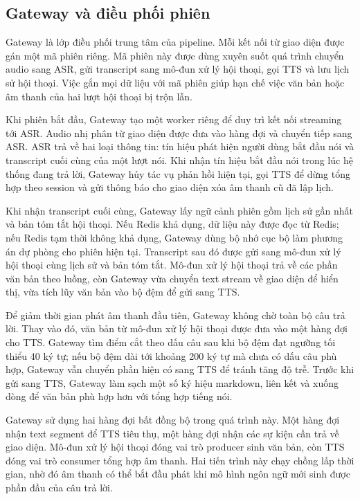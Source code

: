 \documentclass[a4paper,13pt,twoside]{report}
\begin{document}
\subsection{Gateway và điều phối phiên}

Gateway là lớp điều phối trung tâm của pipeline. Mỗi kết nối từ giao diện được gán một mã phiên riêng. Mã phiên này được dùng xuyên suốt quá trình chuyển audio sang ASR, gửi transcript sang mô-đun xử lý hội thoại, gọi TTS và lưu lịch sử hội thoại. Việc gắn mọi dữ liệu với mã phiên giúp hạn chế việc văn bản hoặc âm thanh của hai lượt hội thoại bị trộn lẫn.

Khi phiên bắt đầu, Gateway tạo một worker riêng để duy trì kết nối streaming tới ASR. Audio nhị phân từ giao diện được đưa vào hàng đợi và chuyển tiếp sang ASR. ASR trả về hai loại thông tin: tín hiệu phát hiện người dùng bắt đầu nói và transcript cuối cùng của một lượt nói. Khi nhận tín hiệu bắt đầu nói trong lúc hệ thống đang trả lời, Gateway hủy tác vụ phản hồi hiện tại, gọi TTS để dừng tổng hợp theo session và gửi thông báo cho giao diện xóa âm thanh cũ đã lập lịch.

Khi nhận transcript cuối cùng, Gateway lấy ngữ cảnh phiên gồm lịch sử gần nhất và bản tóm tắt hội thoại. Nếu Redis khả dụng, dữ liệu này được đọc từ Redis; nếu Redis tạm thời không khả dụng, Gateway dùng bộ nhớ cục bộ làm phương án dự phòng cho phiên hiện tại. Transcript sau đó được gửi sang mô-đun xử lý hội thoại cùng lịch sử và bản tóm tắt. Mô-đun xử lý hội thoại trả về các phần văn bản theo luồng, còn Gateway vừa chuyển text stream về giao diện để hiển thị, vừa tích lũy văn bản vào bộ đệm để gửi sang TTS.

Để giảm thời gian phát âm thanh đầu tiên, Gateway không chờ toàn bộ câu trả lời. Thay vào đó, văn bản từ mô-đun xử lý hội thoại được đưa vào một hàng đợi cho TTS. Gateway tìm điểm cắt theo dấu câu sau khi bộ đệm đạt ngưỡng tối thiểu 40 ký tự; nếu bộ đệm dài tới khoảng 200 ký tự mà chưa có dấu câu phù hợp, Gateway vẫn chuyển phần hiện có sang TTS để tránh tăng độ trễ. Trước khi gửi sang TTS, Gateway làm sạch một số ký hiệu markdown, liên kết và xuống dòng để văn bản phù hợp hơn với tổng hợp tiếng nói.

Gateway sử dụng hai hàng đợi bất đồng bộ trong quá trình này. Một hàng đợi nhận text segment để TTS tiêu thụ, một hàng đợi nhận các sự kiện cần trả về giao diện. Mô-đun xử lý hội thoại đóng vai trò producer sinh văn bản, còn TTS đóng vai trò consumer tổng hợp âm thanh. Hai tiến trình này chạy chồng lấp thời gian, nhờ đó âm thanh có thể bắt đầu phát khi mô hình ngôn ngữ mới sinh được phần đầu của câu trả lời.
\end{document}
